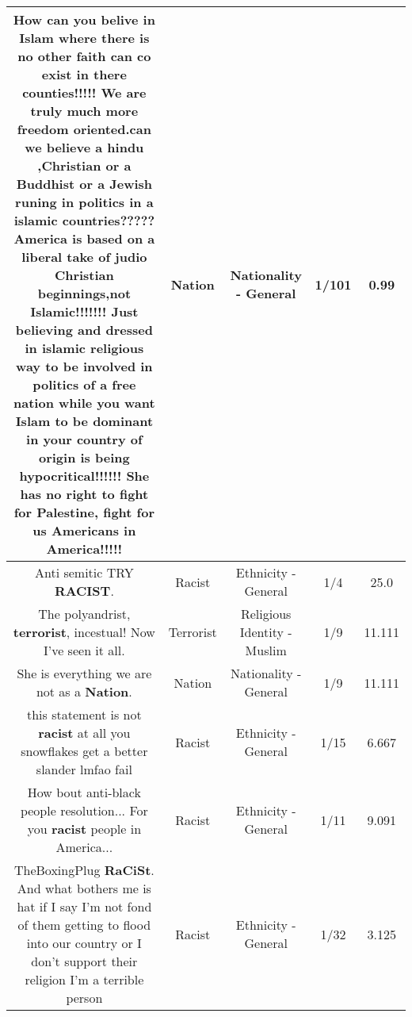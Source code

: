 \documentclass[11pt]{article}
\newlength\mylength
\begin{document}
\begin{center}
\begin{longtable}{|C{.65\mylength}|C{.30\mylength}|C{.12\mylength}|C{.12\mylength}|C{.12\mylength}|}
  \small How can you belive in Islam where there is no  other faith can co exist in there counties!!!!! We are truly much more freedom oriented.can we believe a hindu ,Christian or a Buddhist or a Jewish runing in politics in a islamic countries????? America is based on a liberal take of judio Christian  beginnings,not Islamic!!!!!!! Just believing and dressed in islamic religious way to be involved in politics of a free \textbf{nation} while you want Islam to be dominant in your country of origin is being hypocritical!!!!!! She has no right to fight for Palestine, fight for us Americans in America!!!!!\normalsize   & Nation & Nationality - General & 1/101 & 0.99 \\  \hline
  \small Anti semitic TRY \textbf{RACIST}.\normalsize   & Racist & Ethnicity - General & 1/4 & 25.0 \\  \hline
  \small The polyandrist, \textbf{terrorist}, incestual! Now I've seen it all.\normalsize   & Terrorist & Religious Identity - Muslim & 1/9 & 11.111 \\  \hline
  \small She is everything we are not as a \textbf{Nation}.\normalsize   & Nation & Nationality - General & 1/9 & 11.111 \\  \hline
  \small this statement is not \textbf{racist} at all you snowflakes get a better slander lmfao fail\normalsize   & Racist & Ethnicity - General & 1/15 & 6.667 \\  \hline
  \small How bout anti-black people resolution... For you \textbf{racist} people in America...\normalsize   & Racist & Ethnicity - General & 1/11 & 9.091 \\  \hline
  \small TheBoxingPlug \textbf{RaCiSt}. And what bothers me is hat if I say I'm not fond of them getting to flood into our country or I don't support their religion I'm a terrible person\normalsize   & Racist & Ethnicity - General & 1/32 & 3.125 \\  \hline

\end{longtable}
\end{center}
\end{document}
